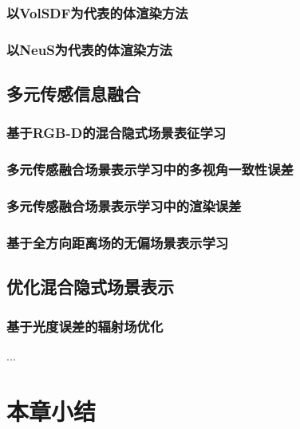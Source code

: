 \subsubsection{以VolSDF为代表的体渲染方法}

\subsubsection{以NeuS为代表的体渲染方法}

\subsection{多元传感信息融合}

\subsubsection{基于RGB-D的混合隐式场景表征学习}

\subsubsection{多元传感融合场景表示学习中的多视角一致性误差}

\subsubsection{多元传感融合场景表示学习中的渲染误差}

\subsubsection{基于全方向距离场的无偏场景表示学习}

\subsection{优化混合隐式场景表示}

\subsubsection{基于光度误差的辐射场优化}

...

\section{本章小结}